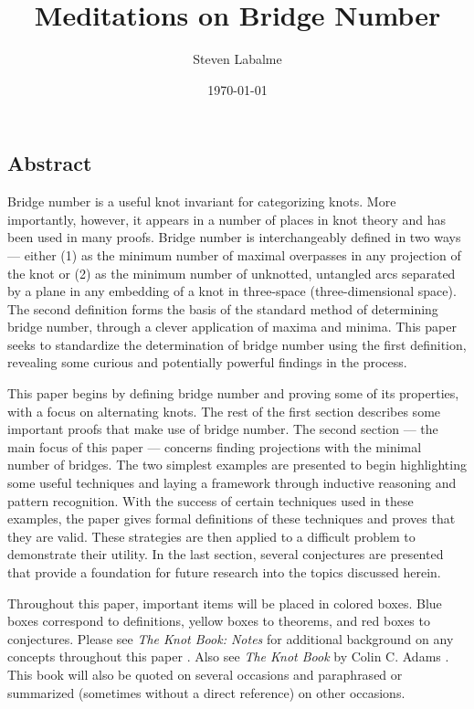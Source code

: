 \documentclass[titlepage,11pt]{article}
\title{Meditations on Bridge Number}
\author{Steven Labalme}
\date{\today}
\begin{document}
\maketitle



\tableofcontents
\listoffigures
\listoftables
\newpage



\pagestyle{fancy}
\fancyhf{}
\renewcommand{\headrulewidth}{0pt}
\setcounter{secnumdepth}{0}
\begin{center}
    \section{Abstract}
\end{center}
Bridge number is a useful knot invariant for categorizing knots. More importantly, however, it appears in a number of places in knot theory and has been used in many proofs. Bridge number is interchangeably defined in two ways --- either (1) as the minimum number of maximal overpasses in any projection of the knot or (2) as the minimum number of unknotted, untangled arcs separated by a plane in any embedding of a knot in three-space (three-dimensional space). The second definition forms the basis of the standard method of determining bridge number, through a clever application of maxima and minima. This paper seeks to standardize the determination of bridge number using the first definition, revealing some curious and potentially powerful findings in the process.\par
This paper begins by defining bridge number and proving some of its properties, with a focus on alternating knots. The rest of the first section describes some important proofs that make use of bridge number. The second section --- the main focus of this paper --- concerns finding projections with the minimal number of bridges. The two simplest examples are presented to begin highlighting some useful techniques and laying a framework through inductive reasoning and pattern recognition. With the success of certain techniques used in these examples, the paper gives formal definitions of these techniques and proves that they are valid. These strategies are then applied to a difficult problem to demonstrate their utility. In the last section, several conjectures are presented that provide a foundation for future research into the topics discussed herein.\par
Throughout this paper, important items will be placed in colored boxes. Blue boxes correspond to definitions, yellow boxes to theorems, and red boxes to conjectures. Please see \emph{The Knot Book: Notes} for additional background on any concepts throughout this paper \cite{bib:knotnotes}. Also see \emph{The Knot Book} by Colin C. Adams \cite{bib:knotbook}. This book will also be quoted on several occasions and paraphrased or summarized (sometimes without a direct reference) on other occasions.
\newpage
\end{document}
